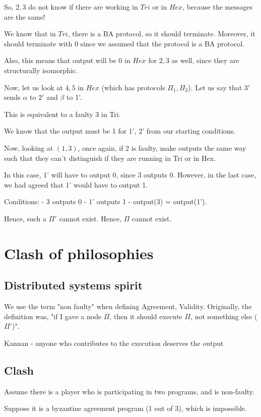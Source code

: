 So, $2, 3$ do not know if there are working in $Tri$ or in $Hex$, because
the messages are the same!

We know that in $Tri$, there is a BA protocol, so it should terminate.
Moreover, it should terminate with $0$ since we assumed that the protocol
is a BA protocol.

Also, this means that output will be $0$ in $Hex$ for $2, 3$ as well, since
they are structurally isomorphic.


Now, let us look at $4, 5$ in $Hex$ (which has protocols $\Pi_1, \Pi_2$).
Let us say that $3'$sends $\alpha$ to $2'$ and $\beta$ to 1'.

This is equivalent to a faulty 3 in Tri.

We know that the output must be 1 for 1', 2' from our starting conditions.


Now, looking at $(1, 3)$, once again, if 2 is faulty, make outputs the
same way such that they can't distinguish if they are running in Tri or in Hex.

In this case, 1' will have to output 0, since 3 outputs 0. However,
in the last case, we had agreed that 1' would have to output 1.

Conditions:
- 3 outputs 0
- 1' outputs 1
- output(3) = output(1').

Hence, such a $\Pi'$ cannot exist. Hence, $\Pi$ cannot exist.


\section{Clash of philosophies}

\subsection{Distributed systems spirit}
We use the term "non faulty" when defining Agreement, Validity. Originally,
the definition was, "if I gave a node $\Pi$, then it should execute $\Pi$,
not something else ($\Pi'$)".

Kannan - anyone who contributes to the execution deserves the output

\subsection{Clash}

Assume there is a player who is participating in two programs, and
is non-faulty.

Suppose it is a byzantine agreement program (1 out of 3), which is impossible.

